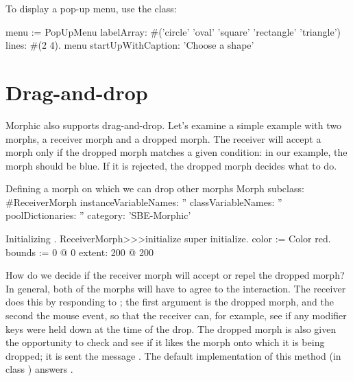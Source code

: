 \documentclass[a4paper,10pt,twoside]{book}
\begin{document}
To display a pop-up menu, use the  class:
\begin{code}{}
menu := PopUpMenu
	labelArray: #('circle' 'oval' 'square' 'rectangle' 'triangle')
	lines: #(2 4).
menu startUpWithCaption: 'Choose a shape'
\end{code}


\section{Drag-and-drop}

Morphic also supports drag-and-drop. Let's examine a simple example with two morphs, a receiver morph and a dropped morph. 
The receiver will accept a morph only if the dropped morph matches a given condition: in our example,  the morph should be blue. If it is rejected, the dropped morph decides what to do.

\begin{classdef}{Defining a morph on which we can drop other morphs}
Morph subclass: #ReceiverMorph
	instanceVariableNames: ''
	classVariableNames: ''
	poolDictionaries: ''
	category: 'SBE-Morphic'
\end{classdef}

\begin{method}{Initializing .}
ReceiverMorph>>>initialize
	super initialize.
	color := Color red.
	bounds := 0 @ 0 extent: 200 @ 200
\end{method}

How do we decide if the receiver morph will accept or repel the dropped morph?
In general, both of the morphs will have to agree to the interaction.
The receiver does this by responding to ; the first argument is the dropped morph, and the second the mouse event, so that the receiver can, for example, see if any modifier keys were held down at the time of the drop. 
The dropped morph is also given the opportunity to check and see if it likes the morph onto which it is being dropped; it is sent the message .  The default implementation of  this method (in class ) answers .
\end{document}
